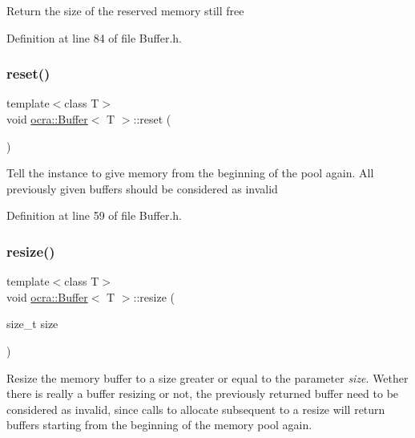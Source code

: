 Return the size of the reserved memory still free 

Definition at line 84 of file Buffer.\+h.

\hypertarget{classocra_1_1Buffer_a3f6d6353bdb0e6eb2e577121be432f5f}{}\label{classocra_1_1Buffer_a3f6d6353bdb0e6eb2e577121be432f5f} 
\subsubsection{\texorpdfstring{reset()}{reset()}}
{\footnotesize\ttfamily template$<$class T$>$ \\
void \hyperlink{classocra_1_1Buffer}{ocra\+::\+Buffer}$<$ T $>$\+::reset (\begin{DoxyParamCaption}{ }\end{DoxyParamCaption})\hspace{0.3cm}{\ttfamily [inline]}}

Tell the instance to give memory from the beginning of the pool again. All previously given buffers should be considered as invalid 

Definition at line 59 of file Buffer.\+h.

\hypertarget{classocra_1_1Buffer_a171d3ec7b50688fd529c8ae3dff7b6d1}{}\label{classocra_1_1Buffer_a171d3ec7b50688fd529c8ae3dff7b6d1} 
\subsubsection{\texorpdfstring{resize()}{resize()}}
{\footnotesize\ttfamily template$<$class T$>$ \\
void \hyperlink{classocra_1_1Buffer}{ocra\+::\+Buffer}$<$ T $>$\+::resize (\begin{DoxyParamCaption}\item[{size\+\_\+t}]{size }\end{DoxyParamCaption})\hspace{0.3cm}{\ttfamily [inline]}}

Resize the memory buffer to a size greater or equal to the parameter {\itshape size}. Wether there is really a buffer resizing or not, the previously returned buffer need to be considered as invalid, since calls to allocate subsequent to a resize will return buffers starting from the beginning of the memory pool again. 

